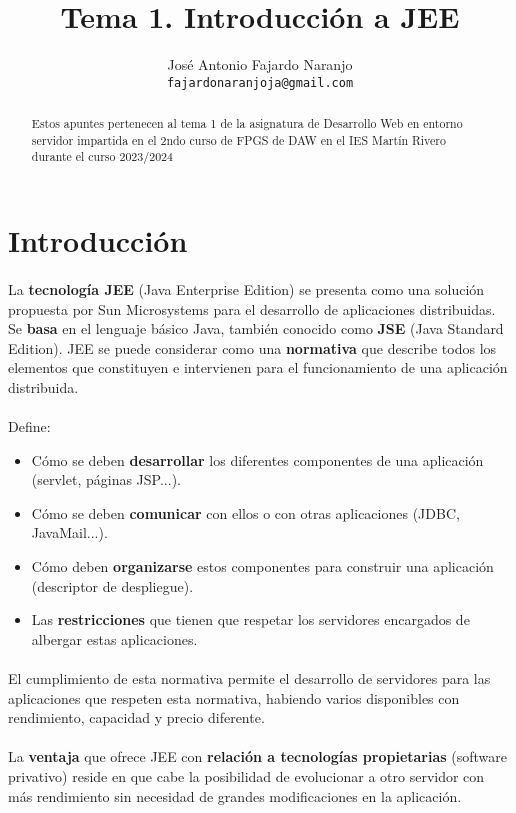\documentclass{article}
\title{Tema 1. Introducción a JEE}
\author{José Antonio Fajardo Naranjo \\
	\small
	\tt{fajardonaranjoja@gmail.com} \\
	\date{}
}
\begin{document}
	\maketitle
	\begin{abstract} 
		\noindent Estos apuntes pertenecen al tema 1 de la asignatura de Desarrollo Web en entorno servidor impartida en el 2ndo curso de FPGS de DAW en el IES Martín Rivero durante el curso 2023/2024  \end{abstract}
		
	\newpage{\ }
	\tableofcontents
	\newpage{\ }
	
	\thispagestyle{empty}
	
	\section{Introducción}
	
	\paragraph{}La \textbf{tecnología JEE} (Java Enterprise Edition) se presenta como una solución propuesta por Sun Microsystems para el desarrollo de aplicaciones distribuidas. Se \textbf{basa} en el lenguaje básico Java, también conocido como \textbf{JSE} (Java Standard Edition). JEE se puede considerar como una \textbf{normativa} que describe todos los elementos que constituyen e intervienen para el funcionamiento de una aplicación distribuida.
	\\
	\\
	Define:
	\begin{itemize}
		\item Cómo se deben \textbf{desarrollar} los diferentes componentes de una aplicación (servlet, páginas JSP...).
		\item Cómo se deben \textbf{comunicar} con ellos o con otras aplicaciones (JDBC, JavaMail...).
		\item Cómo deben \textbf{organizarse} estos componentes para construir una aplicación (descriptor de despliegue).
		\item Las \textbf{restricciones} que tienen que respetar los servidores encargados de albergar estas aplicaciones.
	\end{itemize}
	\paragraph{}El cumplimiento de esta normativa permite el desarrollo de servidores para las aplicaciones que respeten esta normativa, habiendo varios disponibles con rendimiento, capacidad y precio diferente.
	\\
	\\
	La \textbf{ventaja} que ofrece JEE con \textbf{relación a tecnologías propietarias} (software privativo) reside en que cabe la posibilidad de evolucionar a otro servidor con más rendimiento sin necesidad de grandes modificaciones en la aplicación.
	
\end{document}
